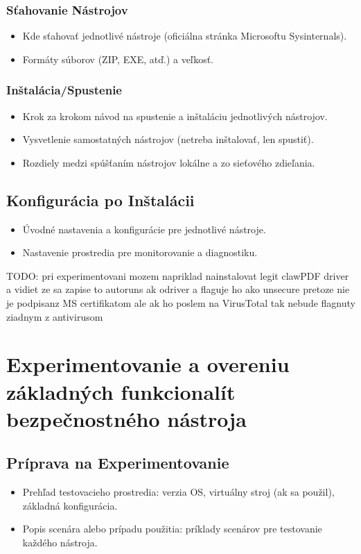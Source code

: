 \documentclass[conference]{IEEEtran}
\begin{document}
\subsubsection{Sťahovanie Nástrojov}
\begin{itemize}
    \item Kde sťahovať jednotlivé nástroje (oficiálna stránka Microsoftu Sysinternals).
    \item Formáty súborov (ZIP, EXE, atď.) a veľkosť.
\end{itemize}

\subsubsection{Inštalácia/Spustenie}
\begin{itemize}
    \item Krok za krokom návod na spustenie a inštaláciu jednotlivých nástrojov.
    \item Vysvetlenie samostatných nástrojov (netreba inštalovať, len spustiť).
    \item Rozdiely medzi spúšťaním nástrojov lokálne a zo sieťového zdieľania.
\end{itemize}

\subsection{Konfigurácia po Inštalácii}
\begin{itemize}
    \item Úvodné nastavenia a konfigurácie pre jednotlivé nástroje.
    \item Nastavenie prostredia pre monitorovanie a diagnostiku.
\end{itemize}

TODO: pri experimentovani mozem napriklad nainstalovat legit clawPDF driver a vidiet ze sa zapise to autoruns ak odriver a flaguje ho ako unsecure pretoze nie je podpisanz MS certifikatom ale ak ho poslem na VirusTotal tak nebude flagnuty ziadnym z antivirusom

\section{Experimentovanie a overeniu základných funkcionalít bezpečnostného nástroja}
\subsection{Príprava na Experimentovanie}
\begin{itemize}
    \item Prehľad testovacieho prostredia: verzia OS, virtuálny stroj (ak sa použil), základná konfigurácia.
    \item Popis scenára alebo prípadu použitia: príklady scenárov pre testovanie každého nástroja.
\end{itemize}
\end{document}
